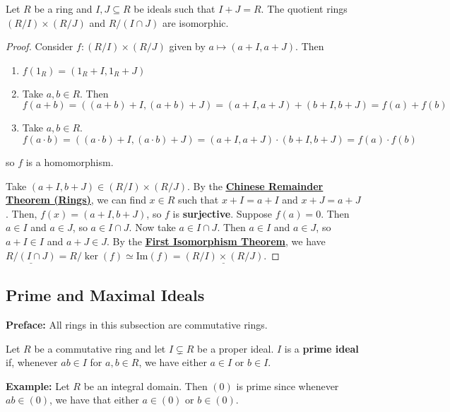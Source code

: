 \documentclass [12pt] {article}
\newenvironment{definition}[1]{\begin{tcolorbox}[title={Definition: #1},colback=blue!5!white,colframe=black!75!blue]}{\end{tcolorbox}}
\newenvironment{theorem}[1]{\begin{tcolorbox}[title={Theorem #1},colback=green!5!white,colframe=black!75!green]}{\end{tcolorbox}}
\renewcommand{\href}[2]{\hyperref[#1]{\bf{\underline{{#2}}}}}
\renewcommand{\bf}[1]{\textbf{{#1}}}
\newcommand{\ul}[1]{\underline{{#1}}}
\renewcommand{\Im}{\text{Im}}
\begin{document}
\newpage
\begin{theorem}{(Chinese Remainder Theorem [Isomorphism])}
    Let $R$ be a ring and $I, J \subseteq R$ be ideals such that $I + J = R$. The quotient rings
    $(R/I) \times (R/J)$ and $R/(I \cap J)$ are isomorphic.
\end{theorem}
\begin{proof}
    Consider $f : (R/I) \times (R/J)$ given by $a \mapsto (a + I, a + J)$. Then
    \begin{enumerate}[label=(\arabic*)]
        \item $f(1_R) = (1_R + I, 1_R + J)$
        \item Take $a, b \in R$. Then
            \vspace{-0.5em}
            \[
                f(a + b)
                = ((a + b) + I, (a + b) + J)
                = (a + I, a + J) + (b + I, b + J)
                = f(a) + f(b)
            \]
        \item \vspace{-0.5em} Take $a, b \in R$.
            \vspace{-0.5em}
            \[
                f(a \cdot b)
                = ((a \cdot b) + I, (a \cdot b) + J)
                = (a + I, a + J) \cdot (b + I, b + J)
                = f(a) \cdot f(b)
            \]
    \end{enumerate}
    \vspace{-1em}
    so $f$ is a homomorphism.
    \vspace{0.5em}

    Take $(a + I, b + J) \in (R/I) \times (R/J)$. By the
    \href{thm:crtrings}{Chinese Remainder Theorem (Rings)}, we can find $x \in R$ such that
    $x + I = a + I$ and $x + J = a + J$. Then, $f(x) = (a + I, b + J)$, so $f$ is \bf{surjective}.
    Suppose $f(a) = 0$. Then $a \in I$ and $a \in J$, so $a \in I \cap J$. Now take
    $a \in I \cap J$. Then $a \in I$ and $a \in J$, so $a + I \in I$ and $a + J \in J$.
    By the \href{thm:isothm}{First Isomorphism Theorem}, we have
    $\ul{R/(I \cap J)} = R/\ker(f) \simeq \Im(f) = \ul{(R/I) \times (R/J)}$.
\end{proof}

\subsection{Prime and Maximal Ideals}
\bf{Preface:} All rings in this subsection are commutative rings.

\begin{definition}{Prime Ideal}
    Let $R$ be a commutative ring and let $I \subsetneq R$ be a proper ideal. $I$ is a
    \bf{prime ideal} if, whenever $ab \in I$ for $a, b \in R$, we have either $a \in I$ or
    $b \in I$.
\end{definition}
\bf{Example:} Let $R$ be an integral domain. Then $(0)$ is prime since whenever $ab \in (0)$, we
have that either $a \in (0)$ or $b \in (0)$.
\vspace{1em}
\end{document}
